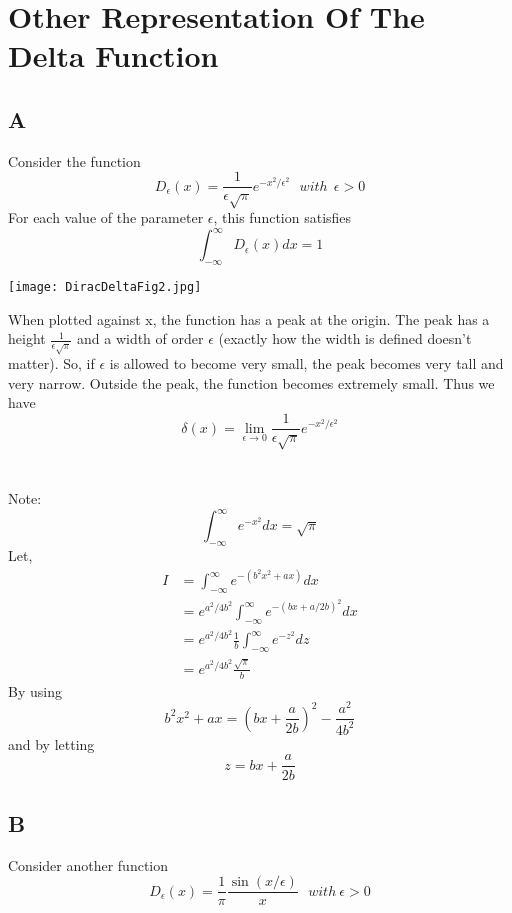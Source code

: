 \section*{Other Representation Of The Delta Function}
\subsection*{A}
Consider the function 
\begin{equation}
D_\epsilon (x) = \frac{1}{\epsilon \sqrt{\pi}} e^{-x^2/\epsilon^2} \ \ \ with\ \ \epsilon > 0
\end{equation}
For each value of the parameter $\epsilon$, this function satisfies $$\int_{-\infty}^\infty D_\epsilon (x)dx =1$$ 

\vspace{0.2cm}
\begin{center}
\texttt{[image: DiracDeltaFig2.jpg]}
\end{center}
When plotted against x, the function has a peak at the origin. The peak has a height $\frac{1}{\epsilon \sqrt{\pi}}$ and a width of order $\epsilon$ (exactly how the width is defined doesn't matter). So, if $\epsilon$ is allowed to become very small, the peak becomes very tall and very narrow. Outside the peak, the function becomes extremely small. Thus we have 
\begin{equation}
\delta (x) = \lim_{\epsilon \to 0} \frac{1}{\epsilon \sqrt{\pi}} e^{-x^2/\epsilon^2}
\end{equation}
\\\\
Note: $$\int_{-\infty}^{\infty} e^{-x^2}dx = \sqrt{\pi}$$
Let, 
\begin{align*}
I &= \int_{-\infty}^{\infty} e^{-(b^2 x^2 + ax)} dx \\
&=e^{a^2/4b^2} \int_{-\infty}^{\infty} e^{-(bx + a/2b)^2} dx \\
&= e^{a^2/4b^2} \frac{1}{b} \int_{-\infty}^{\infty} e^{-z^2} dz \\
&= e^{a^2/4b^2} \frac{\sqrt{\pi}}{b}
\end{align*}
By using $$ b^2 x^2 + ax = (bx + \frac{a}{2b})^2 - \frac{a^2}{4b^2}$$ and by letting $$ z= bx+\frac{a}{2b}$$

\subsection*{B}
Consider another function
\begin{equation}
D_{\epsilon} (x) = \frac{1}{\pi} \frac{\sin (x/\epsilon)}{x} \ \ \ with\ \epsilon>0
\end{equation}

